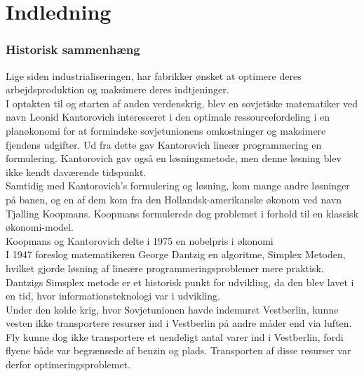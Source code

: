 \chapter{Indledning}
\subsection{Historisk sammenhæng}
Lige siden industrialiseringen, har fabrikker ønsket at optimere deres arbejdsproduktion og maksimere deres indtjeninger. \\ %
I optakten til og starten af anden verdenskrig, blev en sovjetiske matematiker ved navn Leonid Kantorovich interesseret i den optimale ressourcefordeling i en planøkonomi for at formindske sovjetunionens omkostninger og maksimere fjendens udgifter. Ud fra dette gav Kantorovich lineær programmering en formulering. Kantorovich gav også en løsningsmetode, men denne løsning blev ikke kendt daværende tidspunkt.\\
Samtidig med Kantorovich's formulering og løsning, kom  mange andre løsninger på banen, og en af dem kom fra den Hollandsk-amerikanske økonom ved navn Tjalling Koopmans. 
Koopmans formulerede dog problemet i forhold til en klassisk økonomi-model.\\
Koopmans og Kantorovich delte i 1975 en nobelpris i økonomi\\
I 1947 foreslog matematikeren George Dantzig en algoritme, Simplex Metoden, hvilket gjorde løsning af lineære programmeringsproblemer mere praktisk.\\
Dantzigs Simsplex metode er et historisk punkt for udvikling, da den blev lavet i en tid, hvor informationsteknologi var i udvikling.
\\%
Under den kolde krig, hvor Sovjetunionen havde indemuret Vestberlin, kunne vesten ikke transportere resurser ind i Vestberlin på andre måder end via luften.
Fly kunne dog ikke transportere et uendeligt antal varer ind i Vestberlin, fordi flyene både var begrænsede af benzin og plads. 
Transporten af disse resurser var derfor optimeringsproblemet.



